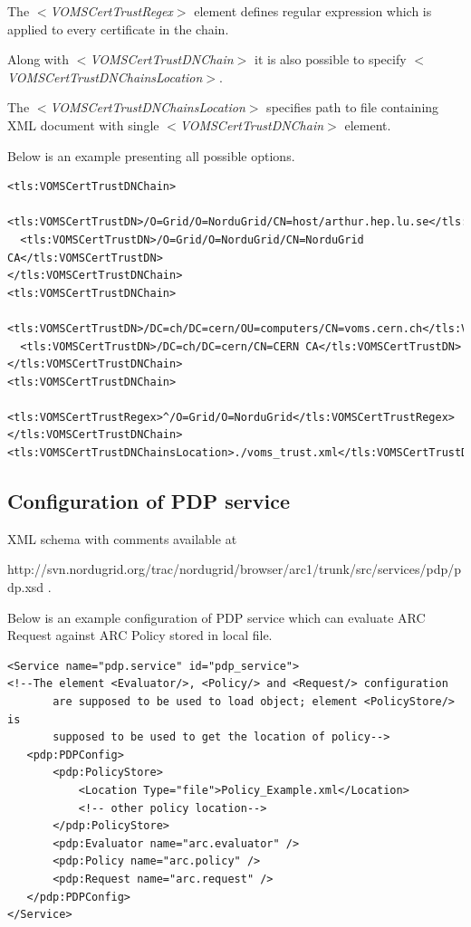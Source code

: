 \documentclass{article}                            %
\begin{document}
The \textit{$<$VOMSCertTrustRegex$>$} element defines regular expression which is applied to every certificate in the chain.

Along with \textit{$<$VOMSCertTrustDNChain$>$} it is also possible to specify \textit{$<$VOMSCertTrustDNChainsLocation$>$}.

The \textit{$<$VOMSCertTrustDNChainsLocation$>$} specifies path to file containing XML document with single \textit{$<$VOMSCertTrustDNChain$>$} element.

Below is an example presenting all possible options.

\begin{verbatim}
<tls:VOMSCertTrustDNChain> 
  <tls:VOMSCertTrustDN>/O=Grid/O=NorduGrid/CN=host/arthur.hep.lu.se</tls:VOMSCertTrustDN>
  <tls:VOMSCertTrustDN>/O=Grid/O=NorduGrid/CN=NorduGrid CA</tls:VOMSCertTrustDN>
</tls:VOMSCertTrustDNChain>
<tls:VOMSCertTrustDNChain>
  <tls:VOMSCertTrustDN>/DC=ch/DC=cern/OU=computers/CN=voms.cern.ch</tls:VOMSCertTrustDN>
  <tls:VOMSCertTrustDN>/DC=ch/DC=cern/CN=CERN CA</tls:VOMSCertTrustDN>
</tls:VOMSCertTrustDNChain>
<tls:VOMSCertTrustDNChain>
  <tls:VOMSCertTrustRegex>^/O=Grid/O=NorduGrid</tls:VOMSCertTrustRegex>
</tls:VOMSCertTrustDNChain>
<tls:VOMSCertTrustDNChainsLocation>./voms_trust.xml</tls:VOMSCertTrustDNChainsLocation>
\end{verbatim}


\subsection{Configuration of PDP service} %
\label{subsec:pdpservice_conf}
XML schema with comments available at 

http://svn.nordugrid.org/trac/nordugrid/browser/arc1/trunk/src/services/pdp/pdp.xsd .

Below is an example configuration of PDP service which can evaluate ARC Request against ARC Policy stored in local file.

\begin{verbatim}
<Service name="pdp.service" id="pdp_service">
<!--The element <Evaluator/>, <Policy/> and <Request/> configuration
       are supposed to be used to load object; element <PolicyStore/> is
       supposed to be used to get the location of policy-->
   <pdp:PDPConfig>
       <pdp:PolicyStore>
           <Location Type="file">Policy_Example.xml</Location>
           <!-- other policy location-->
       </pdp:PolicyStore>
       <pdp:Evaluator name="arc.evaluator" />
       <pdp:Policy name="arc.policy" />
       <pdp:Request name="arc.request" />
   </pdp:PDPConfig>
</Service>
\end{verbatim}
\end{document}
